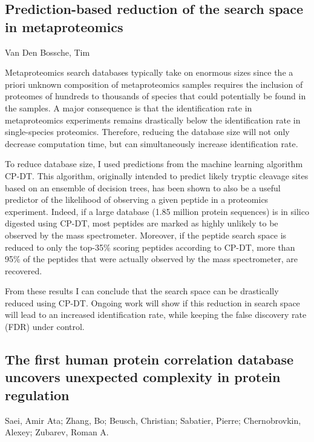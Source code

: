 {\subsection*{\color{eubicRed} Prediction-based reduction of the search space in metaproteomics}
{\color{eubicGray}Van Den Bossche, Tim}

Metaproteomics search databases typically take on enormous sizes since the a priori unknown composition of metaproteomics samples requires the inclusion of proteomes of hundreds to thousands of species that could potentially be found in the samples. A major consequence is that the identification rate in metaproteomics experiments remains drastically below the identification rate in single-species proteomics. Therefore, reducing the database size will not only decrease computation time, but can simultaneously increase identification rate.

To reduce database size, I used predictions from the machine learning algorithm CP-DT. This algorithm, originally intended to predict likely tryptic cleavage sites based on an ensemble of decision trees, has been shown to also be a useful predictor of the likelihood of observing a given peptide in a proteomics experiment. Indeed, if a large database (1.85 million protein sequences) is in silico digested using CP-DT, most peptides are marked as highly unlikely to be observed by the mass spectrometer. Moreover, if the peptide search space is reduced to only the top-35\% scoring peptides according to CP-DT, more than 95\% of the peptides that were actually observed by the mass spectrometer, are recovered.

From these results I can conclude that the search space can be drastically reduced using CP-DT. Ongoing work will show if this reduction in search space will lead to an increased identification rate, while keeping the false discovery rate (FDR) under control.


\subsection*{\color{eubicRed} The first human protein correlation database uncovers unexpected complexity in protein regulation}
{\color{eubicGray}Saei, Amir Ata;
Zhang, Bo;
Beusch, Christian;
Sabatier, Pierre;
Chernobrovkin, Alexey;
Zubarev, Roman A.}

}
